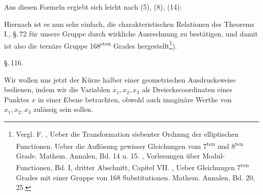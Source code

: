 Aus diesen Formeln ergiebt sich leicht nach (5), (8), (14):

Hiernach ist es nun sehr einfach, die charakteristischen Relationen des Theorems I., \S.\,72 für unsere Gruppe durch wirkliche Ausrechnung zu bestätigen, und damit ist also die ternäre Gruppe 168\textsuperscript{sten} Grades hergestellt\footnote{Vergl. F. , \glqq Ueber die Transformation siebenter Ordnung der elliptischen Functionen\grqq{}. \glqq Ueber die Auflösung gewisser Gleichungen vom 7\textsuperscript{ten} und 8\textsuperscript{ten} Grade\grqq{}. Mathem. Annalen, Bd. 14 u. 15. , Vorlesungen über Modul-Functionen, Bd. I, dritter Abschnitt, Capitel VII. , \glqq Ueber Gleichungen 7\textsuperscript{ten} Grades mit einer Gruppe von 168 Substitutionen\grqq{}. Mathem. Annalen, Bd. 20, 25.}).

\begin{center}
\S.\,116.\\[2pt]
\end{center}

Wir wollen uns jetzt der Kürze halber einer geometrischen Ausdrucksweise bedienen, indem wir die Variablen $x_1, x_2, x_3$ als Dreieckscoordinaten eines Punktes $x$ in einer Ebene betrachten, obwohl auch imaginäre Werthe von $x_1, x_2, x_3$ zulässig sein sollen.

